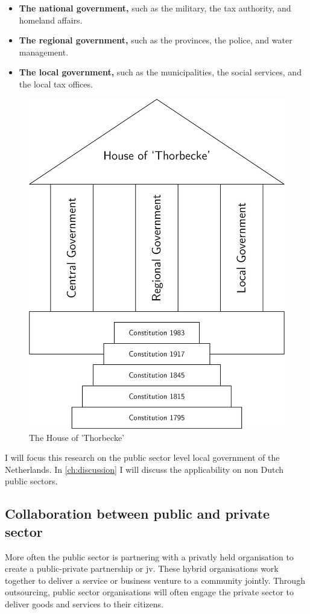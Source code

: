 \begin{itemize}
	\item{\textbf{The national government,} such as the military, the tax authority, and homeland affairs.}
	\item{\textbf{The regional government,} such as the provinces, the police, and water management.}
	\item{\textbf{The local government,} such as the municipalities, the social services, and the local tax offices.}
\end{itemize}

\begin{figure}[H]
	\centering
	\includegraphics[width=0.4\linewidth]{images/thorbecke}
	\caption[The House of 'Thorbecke']{The House of 'Thorbecke'}
	\label{fig:houseofthorbecke}
\end{figure}


I will focus this research on the public sector level local government of the Netherlands. In \cref{ch:discussion} I will discuss the applicability on non Dutch public sectors.



\subsection{Collaboration between public and private sector}

More often the public sector is partnering with a privatly held organisation to create a public-private partnership or \acrfull{jv}. These hybrid organisations work together to deliver a service or business venture to a community jointly. Through outsourcing, public sector organisations will often engage the private sector to deliver goods and services to their citizens. 

